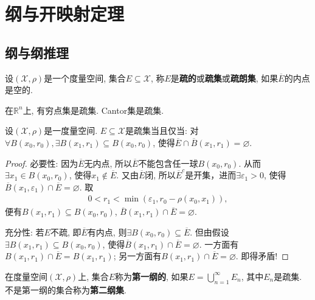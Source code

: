 \documentclass[../../main.tex]{subfiles}%
\begin{document}
\section{纲与开映射定理}

\subsection{纲与纲推理}

\begin{definition}
设$(\mathscr{X},\rho)$是一个度量空间, 集合$E\subseteq\mathscr{X}$, 称$E$是\textbf{疏的}或\textbf{疏集}或\textbf{疏朗集}, 如果$\overline{E}$的内点是空的.
\end{definition}

\begin{examples}
在$\mathbb{R}^n$上, 有穷点集是疏集. Cantor集是疏集.
\end{examples}

\begin{proposition}
设$(\mathscr{X},\rho)$是一度量空间. $E\subseteq\mathscr{X}$是疏集当且仅当: 对$\forall B(x_0,r_0),\exists B(x_1,r_1)\subseteq B(x_0,r_0)$, 使得$\overline{E}\cap\overline{B}(x_1,r_1)=\varnothing$.
\end{proposition}
\begin{proof}

{\heiti 必要性:} 因为$\overline{E}$无内点, 所以$\overline{E}$不能包含任一球$B(x_0,r_0)$. 从而$\exists x_1\in B(x_0,r_0)$, 使得$x_1\notin\overline{E}$. 又由$\overline{E}$闭, 所以$\overline{E}^c$是开集，进而$\exists\varepsilon_1>0$, 使得$\overline{B}(x_1,\varepsilon_1)\cap\overline{E}=\varnothing$. 取
\begin{align*}
0<r_1<\min(\varepsilon_1,r_0-\rho(x_0,x_1)),
\end{align*}
便有$B(x_1,r_1)\subseteq B(x_0,r_0)$, $\overline{B}(x_1,r_1)\cap\overline{E}=\varnothing$.

{\heiti 充分性:} 若$E$不疏, 即$\overline{E}$有内点, 则$\exists B(x_0,r_0)\subseteq\overline{E}$. 但由假设$\exists B(x_1,r_1)\subseteq B(x_0,r_0)$, 使得$\overline{B}(x_1,r_1)\cap\overline{E}=\varnothing$. 一方面有$B(x_1,r_1)\cap\overline{E}=B(x_1,r_1)$; 另一方面有$B(x_1,r_1)\cap\overline{E}=\varnothing$. 即得矛盾!

\end{proof}

\begin{definition}
在度量空间$(\mathscr{X},\rho)$上, 集合$E$称为\textbf{第一纲的}, 如果$E=\bigcup\limits_{n=1}^{\infty}E_n$, 其中$E_n$是疏集. 不是第一纲的集合称为\textbf{第二纲集}.
\end{definition}
\end{document}
